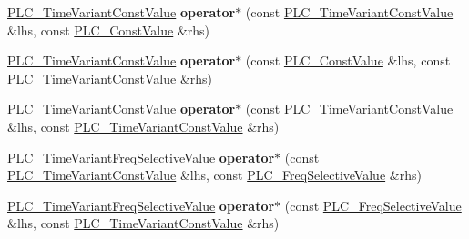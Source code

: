 \begin{DoxyCompactItemize}
\item 
\hypertarget{classns3_1_1PLC__TimeVariantConstValue_ab76520fe3f17dc41a0bfc4494bac8ed0}{\hyperlink{classns3_1_1PLC__TimeVariantConstValue}{\-P\-L\-C\-\_\-\-Time\-Variant\-Const\-Value} {\bfseries operator$\ast$} (const \hyperlink{classns3_1_1PLC__TimeVariantConstValue}{\-P\-L\-C\-\_\-\-Time\-Variant\-Const\-Value} \&lhs, const \hyperlink{classns3_1_1PLC__ConstValue}{\-P\-L\-C\-\_\-\-Const\-Value} \&rhs)}\label{classns3_1_1PLC__TimeVariantConstValue_ab76520fe3f17dc41a0bfc4494bac8ed0}

\item 
\hypertarget{classns3_1_1PLC__TimeVariantConstValue_a2b69e436f62b79948cd6b8e2dd74baf5}{\hyperlink{classns3_1_1PLC__TimeVariantConstValue}{\-P\-L\-C\-\_\-\-Time\-Variant\-Const\-Value} {\bfseries operator$\ast$} (const \hyperlink{classns3_1_1PLC__ConstValue}{\-P\-L\-C\-\_\-\-Const\-Value} \&lhs, const \hyperlink{classns3_1_1PLC__TimeVariantConstValue}{\-P\-L\-C\-\_\-\-Time\-Variant\-Const\-Value} \&rhs)}\label{classns3_1_1PLC__TimeVariantConstValue_a2b69e436f62b79948cd6b8e2dd74baf5}

\item 
\hypertarget{classns3_1_1PLC__TimeVariantConstValue_a61b5f2cc10217f4c4b37ec2624892dfa}{\hyperlink{classns3_1_1PLC__TimeVariantConstValue}{\-P\-L\-C\-\_\-\-Time\-Variant\-Const\-Value} {\bfseries operator$\ast$} (const \hyperlink{classns3_1_1PLC__TimeVariantConstValue}{\-P\-L\-C\-\_\-\-Time\-Variant\-Const\-Value} \&lhs, const \hyperlink{classns3_1_1PLC__TimeVariantConstValue}{\-P\-L\-C\-\_\-\-Time\-Variant\-Const\-Value} \&rhs)}\label{classns3_1_1PLC__TimeVariantConstValue_a61b5f2cc10217f4c4b37ec2624892dfa}

\item 
\hypertarget{classns3_1_1PLC__TimeVariantConstValue_a98a7967618d0d619603a8af279eb8919}{\hyperlink{classns3_1_1PLC__TimeVariantFreqSelectiveValue}{\-P\-L\-C\-\_\-\-Time\-Variant\-Freq\-Selective\-Value} {\bfseries operator$\ast$} (const \hyperlink{classns3_1_1PLC__TimeVariantConstValue}{\-P\-L\-C\-\_\-\-Time\-Variant\-Const\-Value} \&lhs, const \hyperlink{classns3_1_1PLC__FreqSelectiveValue}{\-P\-L\-C\-\_\-\-Freq\-Selective\-Value} \&rhs)}\label{classns3_1_1PLC__TimeVariantConstValue_a98a7967618d0d619603a8af279eb8919}

\item 
\hypertarget{classns3_1_1PLC__TimeVariantConstValue_a94310ec03556c2390343a5e2239ca9cf}{\hyperlink{classns3_1_1PLC__TimeVariantFreqSelectiveValue}{\-P\-L\-C\-\_\-\-Time\-Variant\-Freq\-Selective\-Value} {\bfseries operator$\ast$} (const \hyperlink{classns3_1_1PLC__FreqSelectiveValue}{\-P\-L\-C\-\_\-\-Freq\-Selective\-Value} \&lhs, const \hyperlink{classns3_1_1PLC__TimeVariantConstValue}{\-P\-L\-C\-\_\-\-Time\-Variant\-Const\-Value} \&rhs)}\label{classns3_1_1PLC__TimeVariantConstValue_a94310ec03556c2390343a5e2239ca9cf}


\end{DoxyCompactItemize}
